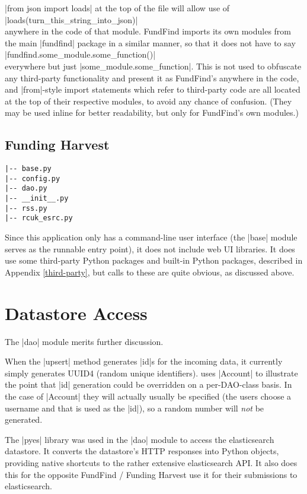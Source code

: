 |from json import loads| at the top of the file will allow use of
\\|loads(turn_this_string_into_json)| 
\\anywhere in the code of that module. FundFind imports its own modules from the main |fundfind| package in a similar manner, so that it does not have to say
\\|fundfind.some_module.some_function()| 
\\everywhere but just |some_module.some_function|. This is not used to obfuscate any third-party functionality and present it as FundFind's anywhere in the code, and |from|-style import statements which refer to third-party code are all located at the top of their respective modules, to avoid any chance of confusion. (They may be used inline for better readability, but only for FundFind's own modules.)

\subsection{Funding Harvest}
\begin{verbatim}
|-- base.py
|-- config.py
|-- dao.py
|-- __init__.py
|-- rss.py
|-- rcuk_esrc.py
\end{verbatim}

Since this application only has a command-line user interface (the |base| module serves as the runnable entry point), it does not include web UI libraries. It does use some third-party Python packages and built-in Python packages, described in Appendix \ref{third-party}, but calls to these are quite obvious, as discussed above.


\section{Datastore Access}
\label{impl-datastore}
The |dao| module merits further discussion.

When the |upsert| method generates |id|s for the incoming data, it currently simply generates UUID4 (random unique identifiers).  uses |Account| to illustrate the point that |id| generation could be overridden on a per-DAO-class basis. In the case of |Account| they will actually usually be specified (the users choose a username and that is used as the |id|), so a random number will \emph{not} be generated.

The |pyes| library was used in the |dao| module to access the elasticsearch datastore. It converts the datastore's HTTP responses into Python objects, providing native shortcuts to the rather extensive elasticsearch API. It also does this for the opposite FundFind / Funding Harvest use it for their submissions to elasticsearch.

